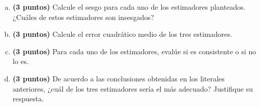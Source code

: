 \documentclass[../main.tex]{subfiles}
\begin{document}
\begin{enumerate}[(a)]

\item \textbf{(3 puntos)} Calcule el sesgo para cada uno de los estimadores planteados. ¿Cuáles de estos estimadores son insesgados?

\item \textbf{(3 puntos)} Calcule el error cuadrático medio de los tres estimadores.

\item \textbf{(3 puntos)} Para cada uno de los estimadores, evalúe si es consistente o si no lo es.

\item \textbf{(3 puntos)} De acuerdo a las conclusiones obtenidas en los literales anteriores, ¿cuál de los tres estimadores sería el más adecuado? Justifique su respuesta.

\end{enumerate}
\end{document}
